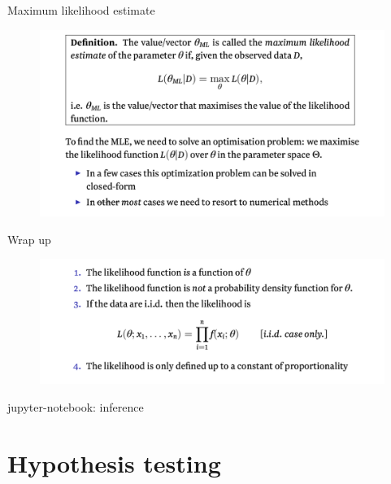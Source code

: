 \documentclass{beamer}
\begin{document}
\begin{frame}{Maximum likelihood estimate}

        \begin{figure}
                \includegraphics[width=\linewidth]{like9.png}
        \end{figure}

\end{frame}

\begin{frame}{Wrap up}

	\begin{figure}
                \includegraphics[width=\linewidth]{like10.png}
        \end{figure}

	\tiny
	jupyter-notebook: inference 

\end{frame}

\section{Hypothesis testing}
\end{document}
